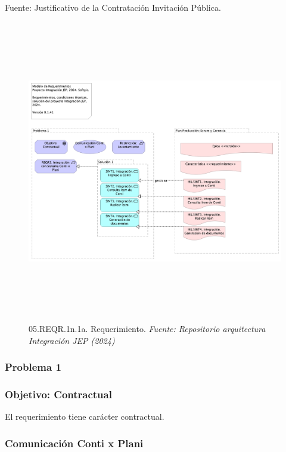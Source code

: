 \documentclass[
  paper=a4,
  ,captions=tableheading
]{scrartcl}
\begin{document}
Fuente: Justificativo de la Contratación Invitación Pública.

\begin{figure}
\centering
\includegraphics[width=\textwidth,height=5.20833in]{images/05.REQR.1n.1a.Requerimiento.png}
\caption{05.REQR.1n.1a. Requerimiento. \emph{Fuente: Repositorio
arquitectura Integración JEP
(2024)}}\label{fig:id-01ff385d2e284d618086769dfc871d38}
\end{figure}

\subsubsection{Problema 1}\label{sec:problema-1}

\subsubsection{Objetivo: Contractual}\label{sec:objetivo-contractual}

El requerimiento tiene carácter contractual.

\subsubsection{Comunicación Conti x
Plani}\label{sec:comunicaciuxf3n-conti-x-plani}
\end{document}
